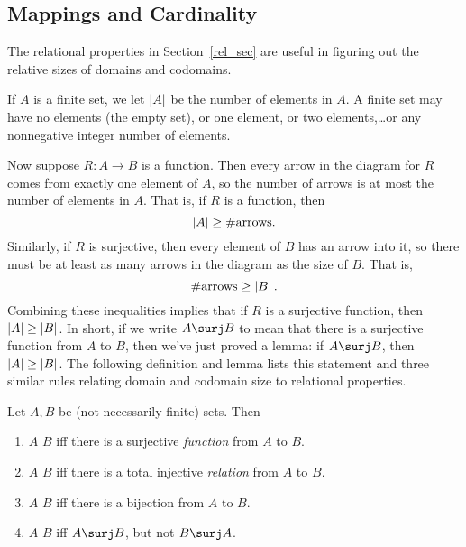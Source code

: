 \label{mappingrule_sec}

\subsection{Mappings and Cardinality}
The relational properties in Section~\ref{rel_sec} are useful in
figuring out the relative sizes of domains and codomains.

If $A$ is a finite set, we let $\left|A\right|$ be the number of elements in
$A$.  A finite set may have no elements (the empty set), or one
element, or two elements,\dots or any nonnegative integer number of
elements.

Now suppose $R:A \to B$ is a function.  Then every arrow in the diagram
for $R$ comes from exactly one element of $A$, so the number of arrows is
at most the number of elements in $A$.  That is, if $R$ is a function,
then
\[
\left|A\right| \geq \#\text{arrows}.
\]
Similarly, if $R$ is surjective, then every element of $B$ has an arrow
into it, so there must be at least as many arrows in the diagram as the
size of $B$.  That is,
\[
\#\text{arrows} \geq \left|B\right|.
\]
Combining these inequalities implies that if $R$ is a surjective
function, then $\left|A\right| \geq \left|B\right|$.  In short, if we write
$A \surj B$ to mean that there is a surjective function from $A$ to
$B$, then we've just proved a lemma: if $A \surj B$, then
$\left|A\right| \geq \left|B\right|$.  The following definition and lemma lists
this statement and three similar rules relating domain and codomain
size to relational properties.

\begin{definition}\label{bigger}
  Let $A,B$ be (not necessarily finite) sets.  Then
  \begin{enumerate}
  \item $A$ \term{$\surj$} $B$ iff there is a surjective \emph{function} from $A$ to $B$.  

  \item $A$ \term{$\inj$} $B$ iff there is a total injective \emph{relation} from $A$ to $B$.

  \item $A$ \term{$\bij$} $B$ iff there is a bijection from $A$ to $B$.  

  \item $A$ \term{$\strict$} $B$ iff $A \surj B$, but not $B \surj A$.  

  \end{enumerate}
\end{definition}



